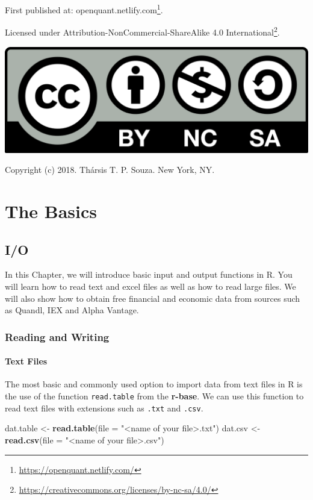 \documentclass[]{book}
\newenvironment{Shaded}{\begin{snugshade}}{\end{snugshade}}
\newcommand{\KeywordTok}[1]{\textcolor[rgb]{0.13,0.29,0.53}{\textbf{#1}}}
\newcommand{\DataTypeTok}[1]{\textcolor[rgb]{0.13,0.29,0.53}{#1}}
\newcommand{\StringTok}[1]{\textcolor[rgb]{0.31,0.60,0.02}{#1}}
\newcommand{\NormalTok}[1]{#1}
\DeclareRobustCommand{\href}[2]{#2\footnote{\url{#1}}}
\let\BeginKnitrBlock\begin \let\EndKnitrBlock\end
\begin{document}
First published at:
\href{https://openquant.netlify.com/}{openquant.netlify.com}.

Licensed under
\href{https://creativecommons.org/licenses/by-nc-sa/4.0/}{Attribution-NonCommercial-ShareAlike
4.0 International}.

\includegraphics[width=0.2\linewidth]{fig/by-nc-sa}

\BeginKnitrBlock{flushright}
Copyright (c) 2018. Thársis T. P. Souza. New York, NY.
\EndKnitrBlock{flushright}

\part{The Basics}\label{part-the-basics}

\chapter{I/O}\label{io}

In this Chapter, we will introduce basic input and output functions in
R. You will learn how to read text and excel files as well as how to
read large files. We will also show how to obtain free financial and
economic data from sources such as Quandl, IEX and Alpha Vantage.

\section{Reading and Writing}\label{reading-and-writing}

\subsection{Text Files}\label{text-files}

The most basic and commonly used option to import data from text files
in R is the use of the function \texttt{read.table} from the
\textbf{r-base}. We can use this function to read text files with
extensions such as \texttt{.txt} and \texttt{.csv}.

\begin{Shaded}
\begin{Highlighting}[]
\NormalTok{dat.table <-}\StringTok{ }\KeywordTok{read.table}\NormalTok{(}\DataTypeTok{file =} \StringTok{"<name of your file>.txt"}\NormalTok{)}
\NormalTok{dat.csv <-}\StringTok{ }\KeywordTok{read.csv}\NormalTok{(}\DataTypeTok{file =} \StringTok{"<name of your file>.csv"}\NormalTok{)}
\end{Highlighting}
\end{Shaded}
\end{document}
